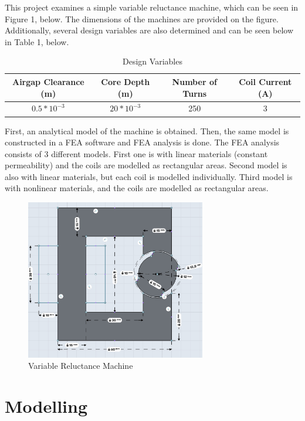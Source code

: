 \documentclass[a4paper, 11pt]{article}
\begin{document}
This project examines a simple variable reluctance machine, which can be seen in Figure 1, below. The dimensions of the machines are provided on the figure. Additionally, several design variables are also determined and can be seen below in Table 1, below. 

\begin{table}[htbp]
	\begin{center}
		\begin{tabular}{|c|c|c|c|}
			Airgap Clearance (m) & Core Depth (m) & Number of Turns & Coil Current (A)\\
			\hline
			$0.5*10^{-3}$ & $20*10^{-3}$ & 250 & 3\\
		\end{tabular}
	\end{center}
	\caption{Design Variables}
\end{table}

First, an analytical model of the machine is obtained. Then, the same model is constructed in a FEA software and FEA analysis is done. The FEA analysis consists of 3 different models. First one is with linear materials (constant permeability) and the coils are modelled as rectangular areas. Second model is also with linear materials, but each coil is modelled individually. Third model is with nonlinear materials, and the coils are modelled as rectangular areas. 

\begin{figure}[h!]
\centering
\includegraphics[width=0.7\textwidth]{VRM.jpeg}
\caption{Variable Reluctance Machine}
\end{figure}

\section{Modelling}
\end{document}
